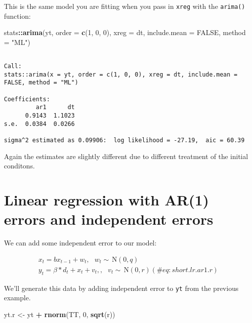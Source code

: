 \documentclass[12pt,]{book}
\newenvironment{Shaded}{\begin{snugshade}}{\end{snugshade}}
\newcommand{\DataTypeTok}[1]{\textcolor[rgb]{0.13,0.29,0.53}{#1}}
\newcommand{\DecValTok}[1]{\textcolor[rgb]{0.00,0.00,0.81}{#1}}
\newcommand{\KeywordTok}[1]{\textcolor[rgb]{0.13,0.29,0.53}{\textbf{#1}}}
\newcommand{\NormalTok}[1]{#1}
\newcommand{\OperatorTok}[1]{\textcolor[rgb]{0.81,0.36,0.00}{\textbf{#1}}}
\newcommand{\OtherTok}[1]{\textcolor[rgb]{0.56,0.35,0.01}{#1}}
\newcommand{\StringTok}[1]{\textcolor[rgb]{0.31,0.60,0.02}{#1}}
\begin{document}
This is the same model you are fitting when you pass in \texttt{xreg} with the \texttt{arima()} function:

\begin{Shaded}
\begin{Highlighting}[]
\NormalTok{stats}\OperatorTok{::}\KeywordTok{arima}\NormalTok{(yt, }\DataTypeTok{order =} \KeywordTok{c}\NormalTok{(}\DecValTok{1}\NormalTok{, }\DecValTok{0}\NormalTok{, }\DecValTok{0}\NormalTok{), }\DataTypeTok{xreg =}\NormalTok{ dt, }\DataTypeTok{include.mean =} \OtherTok{FALSE}\NormalTok{, }
    \DataTypeTok{method =} \StringTok{"ML"}\NormalTok{)}
\end{Highlighting}
\end{Shaded}

\begin{verbatim}

Call:
stats::arima(x = yt, order = c(1, 0, 0), xreg = dt, include.mean = FALSE, method = "ML")

Coefficients:
         ar1      dt
      0.9143  1.1023
s.e.  0.0384  0.0266

sigma^2 estimated as 0.09906:  log likelihood = -27.19,  aic = 60.39
\end{verbatim}

Again the estimates are slightly different due to different treatment of the initial conditons.

\hypertarget{linear-regression-with-ar1-errors-and-independent-errors}{%
\section{Linear regression with AR(1) errors and independent errors}\label{linear-regression-with-ar1-errors-and-independent-errors}}

We can add some independent error to our model:

\begin{gather}
x_{t} = bx_{t-1} + w_{t}, \text{ } w_t \sim \,\text{N}(0,q)  \\
y_{t} = \beta*d_t + x_{t} + v_t, , \text{ } v_t \sim \,\text{N}(0,r)  
(\#eq:short.lr.ar1.r)
\end{gather}

We'll generate this data by adding independent error to \texttt{yt} from the previous example.

\begin{Shaded}
\begin{Highlighting}[]
\NormalTok{yt.r <-}\StringTok{ }\NormalTok{yt }\OperatorTok{+}\StringTok{ }\KeywordTok{rnorm}\NormalTok{(TT, }\DecValTok{0}\NormalTok{, }\KeywordTok{sqrt}\NormalTok{(r))}
\end{Highlighting}
\end{Shaded}
\end{document}
